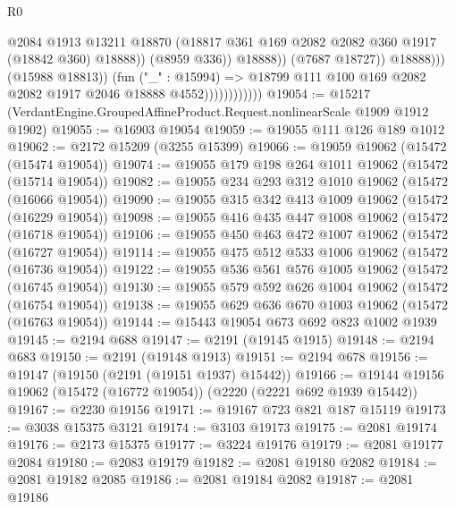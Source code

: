 \begin{lexlean}{R0}
\begin{coremodule}
                                            @2084
                                            @1913
                                            @13211
                                            @18870
                                            (@18817
                                              @361
                                              @169
                                              @2082
                                              @2082
                                              @360
                                              @1917
                                              (@18842 @360)
                                              @18888))
                                          (@8959 @336))
                                        @18888))
                                    (@7687 @18727))
                                  @18888)))
                            (@15988 @18813))
                          (fun ("_" : @15994) =>
                          @18799 @111 @100 @169 @2082 @2082 @1917 @2046 @18888 @4552))))))))))))
@19054 := @15217 (VerdantEngine.GroupedAffineProduct.Request.nonlinearScale @1909 @1912 @1902)
@19055 := @16903 @19054
@19059 := @19055 @111 @126 @189 @1012
@19062 := @2172 @15209 (@3255 @15399)
@19066 := @19059 @19062 (@15472 (@15474 @19054))
@19074 := @19055 @179 @198 @264 @1011 @19062 (@15472 (@15714 @19054))
@19082 := @19055 @234 @293 @312 @1010 @19062 (@15472 (@16066 @19054))
@19090 := @19055 @315 @342 @413 @1009 @19062 (@15472 (@16229 @19054))
@19098 := @19055 @416 @435 @447 @1008 @19062 (@15472 (@16718 @19054))
@19106 := @19055 @450 @463 @472 @1007 @19062 (@15472 (@16727 @19054))
@19114 := @19055 @475 @512 @533 @1006 @19062 (@15472 (@16736 @19054))
@19122 := @19055 @536 @561 @576 @1005 @19062 (@15472 (@16745 @19054))
@19130 := @19055 @579 @592 @626 @1004 @19062 (@15472 (@16754 @19054))
@19138 := @19055 @629 @636 @670 @1003 @19062 (@15472 (@16763 @19054))
@19144 := @15443 @19054 @673 @692 @823 @1002 @1939
@19145 := @2194 @688
@19147 := @2191 (@19145 @1915)
@19148 := @2194 @683
@19150 := @2191 (@19148 @1913)
@19151 := @2194 @678
@19156 := @19147 (@19150 (@2191 (@19151 @1937) @15442))
@19166 := @19144 @19156 @19062 (@15472 (@16772 @19054)) (@2220 (@2221 @692 @1939 @15442))
@19167 := @2230 @19156
@19171 := @19167 @723 @821 @187 @15119
@19173 := @3038 @15375 @3121
@19174 := @3103 @19173
@19175 := @2081 @19174
@19176 := @2173 @15375
@19177 := @3224 @19176
@19179 := @2081 @19177 @2084
@19180 := @2083 @19179
@19182 := @2081 @19180 @2082
@19184 := @2081 @19182 @2085
@19186 := @2081 @19184 @2082
@19187 := @2081 @19186

\end{coremodule}
\end{lexlean}
